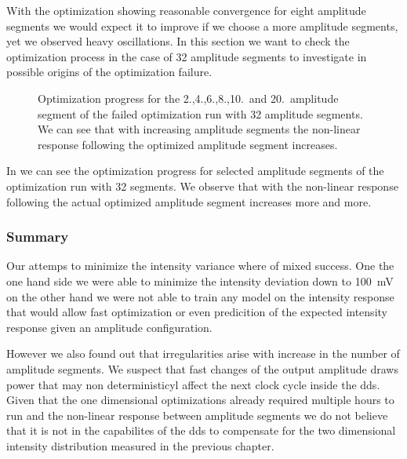 With the optimization showing reasonable convergence for eight amplitude
segments we would expect it to improve if we choose a more amplitude segments,
yet we observed heavy oscillations. In this section we want to check the
optimization process in the case of \num{32} amplitude segments to investigate
in possible origins of the optimization failure.
\begin{figure}[htb]
  \centering
  \begin{adjustbox}{width=\textwidth}
  \end{adjustbox}
  \caption{Optimization progress for the 2.,4.,6.,8.,10.\ and 20.\ amplitude
    segment of the failed optimization run with 32 amplitude segments. We can
    see that with increasing amplitude segments the non-linear response
    following the optimized amplitude segment increases.
  }\label{fig:intensity_optimization_failure}
\end{figure}
In  we can see the optimization
progress for selected amplitude segments of the optimization run with 32
segments. We observe that with the non-linear response following the actual
optimized amplitude segment increases more and more.

\subsubsection{Summary}

Our attemps to minimize the intensity variance where of mixed success. One
the one hand side we were able to minimize the intensity deviation down
to \SI{100}{\milli\volt} on the other hand we were not able to train any
model on the intensity response that would allow fast optimization or even
predicition of the expected intensity response given an amplitude
configuration.

However we also found out that irregularities arise with increase in the
number of amplitude segments. We suspect that fast changes of the output
amplitude draws power that may non deterministicyl affect the next clock
cycle inside the \gls{dds}. Given that the one dimensional optimizations
already required multiple hours to run and the non-linear response between
amplitude segments we do not believe that it is not in the capabilites of the
\gls{dds} to compensate for the two dimensional intensity distribution
measured in the previous chapter.

